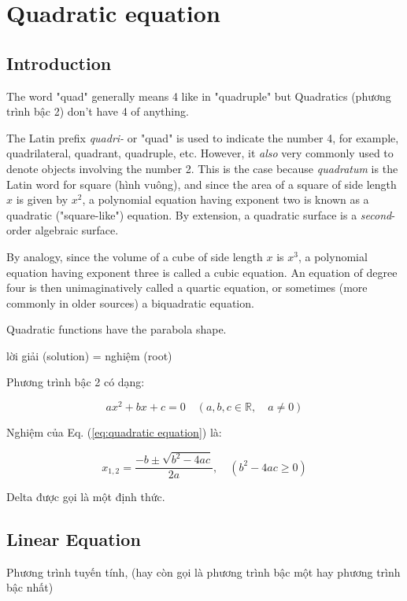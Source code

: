 \chapter{Quadratic equation}

\section{Introduction}

The word "quad" generally means 4 like in "quadruple" but Quadratics (phương trình bậc 2) don't have 4 of anything.

The Latin prefix \textit{quadri-} or "quad" is used to indicate the number 4, for example, quadrilateral, quadrant, quadruple, etc. However, it \textit{also} very commonly used to denote objects involving the number 2. This is the case because \textit{quadratum} is the Latin word for square (hình vuông), and since the area of a square of side length $x$ is given by $x^2$, a polynomial equation having exponent two is known as a quadratic ("square-like") equation. By extension, a quadratic surface is a \textit{second}-order algebraic surface.

By analogy, since the volume of a cube of side length $x$ is $x^3$, a polynomial equation having exponent three is called a cubic equation. An equation of degree four is then unimaginatively called a quartic equation, or sometimes (more commonly in older sources) a biquadratic equation.

Quadratic functions have the parabola shape.


lời giải (solution) = nghiệm (root)

Phương trình bậc 2 có dạng: 

\begin{equation}
  ax^{2}+bx+c=0\quad (a, b, c \in \mathbb{R}, \quad a \ne 0)
  \label{eq:quadratic equation}
\end{equation}

Nghiệm của Eq. (\ref{eq:quadratic equation}) là:

\[x_{1,2}=\frac{-b \pm \sqrt{b^{2}-4ac} }{2a},\quad (b^{2}-4ac \geq0)\]

Delta được gọi là một định thức.

\section{Linear Equation}

Phương trình tuyến tính, (hay còn gọi là phương trình bậc một hay phương trình bậc nhất)

